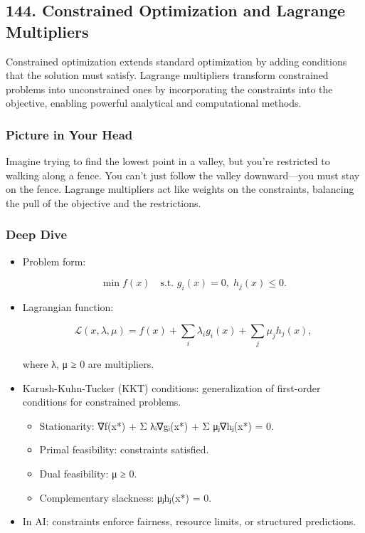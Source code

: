 \documentclass[
  letterpaper,
  DIV=11,
  numbers=noendperiod]{scrreprt}
\providecommand{\tightlist}{%
  \setlength{\itemsep}{0pt}\setlength{\parskip}{0pt}}
\begin{document}
\subsection{144. Constrained Optimization and Lagrange
Multipliers}\label{constrained-optimization-and-lagrange-multipliers}

Constrained optimization extends standard optimization by adding
conditions that the solution must satisfy. Lagrange multipliers
transform constrained problems into unconstrained ones by incorporating
the constraints into the objective, enabling powerful analytical and
computational methods.

\subsubsection{Picture in Your Head}\label{picture-in-your-head-143}

Imagine trying to find the lowest point in a valley, but you're
restricted to walking along a fence. You can't just follow the valley
downward---you must stay on the fence. Lagrange multipliers act like
weights on the constraints, balancing the pull of the objective and the
restrictions.

\subsubsection{Deep Dive}\label{deep-dive-143}

\begin{itemize}
\item
  Problem form:

  \[
  \min f(x) \quad \text{s.t. } g_i(x)=0, \; h_j(x) \leq 0.
  \]
\item
  Lagrangian function:

  \[
  \mathcal{L}(x,λ,μ) = f(x) + \sum_i λ_i g_i(x) + \sum_j μ_j h_j(x),
  \]

  where λ, μ ≥ 0 are multipliers.
\item
  Karush-Kuhn-Tucker (KKT) conditions: generalization of first-order
  conditions for constrained problems.

  \begin{itemize}
  \tightlist
  \item
    Stationarity: ∇f(x*) + Σ λᵢ∇gᵢ(x*) + Σ μⱼ∇hⱼ(x*) = 0.
  \item
    Primal feasibility: constraints satisfied.
  \item
    Dual feasibility: μ ≥ 0.
  \item
    Complementary slackness: μⱼhⱼ(x*) = 0.
  \end{itemize}
\item
  In AI: constraints enforce fairness, resource limits, or structured
  predictions.
\end{itemize}
\end{document}
